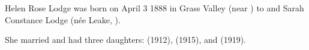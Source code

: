 
Helen Rose Lodge was born on April 3 1888 in Grass Valley (near )\cite{FamilyNotices} 
to 
and Sarah Constance Lodge (n\'{e}e Leake, ).\cite{BMD}

She married  and had three daughters:
 (1912),
 (1915), and
 (1919).
